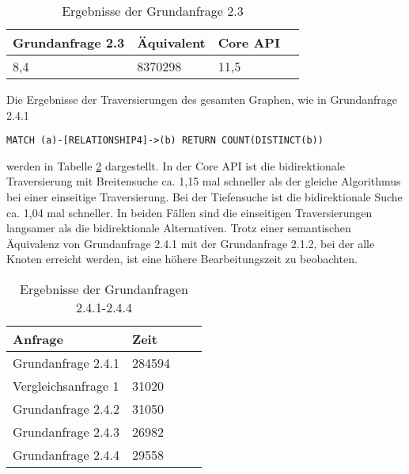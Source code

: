 \FloatBarrier
\begin{table}[!htb]
	\centering
		\begin{tabular}{ |p{3cm}|p{3cm}|p{3cm}|p{3cm}|  }
			\hline
			Grundanfrage 2.3 & Äquivalent&Core API\\
			\hline
			8,4    & 8370298 &  11,5\\
			\hline
		\end{tabular}
		\caption{Ergebnisse der Grundanfrage 2.3}
		\label{tab:Query2_3}
\end{table}
\FloatBarrier
\noindent Die Ergebnisse der Traversierungen des gesamten Graphen, wie in Grundanfrage 2.4.1
 \begin{Verbatim}[frame=single]
MATCH (a)-[RELATIONSHIP4]->(b) RETURN COUNT(DISTINCT(b))
\end{Verbatim}
 werden in Tabelle \ref{tab:Query2_4} dargestellt.
 In der Core API ist die bidirektionale Traversierung mit Breitensuche ca. 1,15 mal schneller als der gleiche Algorithmus bei einer einseitige Traversierung. Bei der Tiefensuche ist die bidirektionale Suche ca. 1,04 mal schneller. In beiden Fällen sind die einseitigen Traversierungen langsamer als die bidirektionale Alternativen. \newline
Trotz einer semantischen Äquivalenz von Grundanfrage 2.4.1 mit der Grundanfrage 2.1.2, bei der alle Knoten erreicht werden, ist eine höhere Bearbeitungszeit zu beobachten. 
\FloatBarrier
\begin{table}[!htb]
	\centering
	\begin{tabular}{ |p{5cm}||p{3cm}|p{3cm}|p{3cm}|  }
		\hline
		Anfrage & Zeit\\
		\hline
		Grundanfrage 2.4.1 & 284594\\
		\hline
		Vergleichsanfrage 1 & 31020  \\
		\hline
		Grundanfrage 2.4.2 & 31050\\
		\hline
		Grundanfrage 2.4.3 &   26982 \\
		\hline
		Grundanfrage 2.4.4 &  29558\\
		\hline
	\end{tabular}
	\caption{Ergebnisse der Grundanfragen 2.4.1-2.4.4}
	\label{tab:Query2_4}
\end{table}
\FloatBarrier

